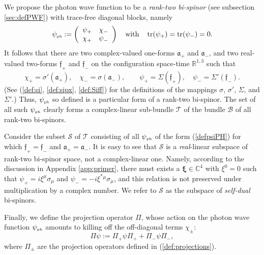 \documentclass[12pt]{article}
\theoremstyle{definition}
\DeclareMathOperator{\tr}{tr}
\newcommand{\refeq}[1]{(\ref{#1})}
\numberwithin{equation}{section}
\newcommand{\fa}{\mathfrak{a}}
\newcommand{\ff}{\mathfrak{f}}
\newcommand{\bfa}{\boldsymbol{\fa}}
\newcommand{\bff}{\boldsymbol{\ff}}
\newcommand{\beq}{\begin{equation}}
\newcommand{\eeq}{\end{equation}}
\newcommand{\cB}{\mathcal{B}}
\newcommand{\cS}{{\mathcal S}}
\newcommand{\cT}{\mathcal{T}}
\newcommand{\xiV}{{\boldsymbol{\xi}}}
\newcommand{\psiPH}{{\psi_{\mbox{\rm\tiny ph}}}}
\newcommand{\Cset}{{\mathbb C}}
\newcommand{\Rset}{{\mathbb R}}
\newcommand{\si}{\sigma}
\newcommand{\Si}{\Sigma}
\begin{document}

We propose the photon wave function to be a {\em rank-two bi-spinor} (see subsection \ref{sec:defPWF}) with trace-free diagonal blocks,
namely
\beq \label{defpsiPH}
\psiPH := \left(\begin{array}{cc} \psi_+ & \chi_-\\ \chi_+ & \psi_- \end{array}\right)\quad \mbox{with}\quad
\tr(\psi_+) = \tr(\psi_-) = 0.
\eeq
 It follows that there are two complex-valued one-forms $\bfa_+$ and $\bfa_-$, and two real-valued two-forms $\bff_+$ and $ \bff_-$ on the 
configuration space-time $\Rset^{1,3}$ such 
that 
\beq \label{Fpm} \chi_+ = \si'(\bfa_+),\quad \chi_-= \si(\bfa_-),\qquad \psi_+ = \Si(\bff_+),\quad
\psi_- = \Si'(\bff_-).
\eeq
(See (\ref{def:si}, \ref{def:sipx}, \ref{def:Siff}) for the definitions of the mappings $\si$, $\si'$, $\Si$, and $\Si'$.) Thus, $\psiPH$ so defined is a particular form of a rank-two bi-spinor. 
 The set of all such $\psiPH$ clearly forms a complex-linear sub-bundle $\cT$ of the bundle $\cB$ of all rank-two bi-spinors.  

Consider the subset $\cS$ of $\cT$ consisting of all $\psiPH$ of the form \refeq{defpsiPH} for which $\bff_+ = \bff_-$ and 
$\bfa_+ = \bfa_-$.
  It is easy to see that $\cS$ is a {\em real}-linear subspace of rank-two bi-spinor space, not a complex-linear one.
  Namely, according to the discussion in Appendix \ref{app:primer}, there must exists a $\xiV \in \Cset^4$ with $\xi^0=0$ such that
$\psi_+ = i \xi^\mu \si_\mu$ and $\psi_- = -i  \xi^\ast{}^\mu \si_\mu$, and this relation is not preserved under multiplication by a 
complex number. 
 We refer to $\cS$ as the subspace of {\em self-dual} bi-spinors.  

Finally, we define the projection operator $\Pi$, whose action on the photon wave function $\psiPH$ amounts to killing off the off-diagonal 
terms $\chi_\pm$:
\beq \label{def:Pi}
\Pi \psi 
:= \Pi_{+}^{} \psi \Pi_{+}^{} + \Pi_{-}^{} \psi \Pi_{-}^{},
\eeq
where $\Pi_\pm$ are the projection operators defined in \refeq{def:projections}.


\end{document}
